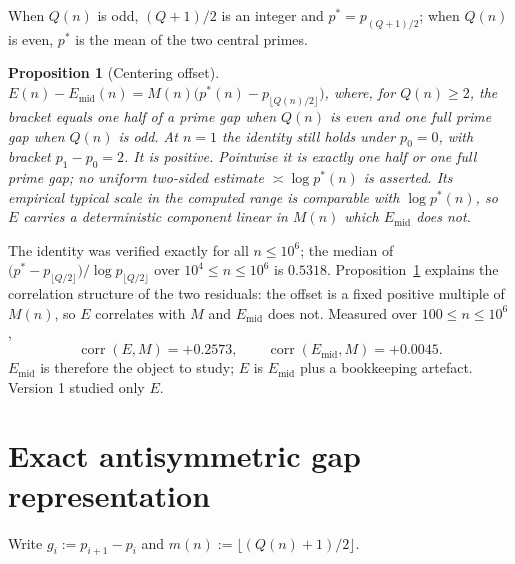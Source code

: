 \documentclass[11pt]{amsart}
\numberwithin{equation}{section}
\theoremstyle{plain}
\newtheorem{proposition}[theorem]{Proposition}
\theoremstyle{definition}
\theoremstyle{remark}
\newcommand{\Mert}{M}
\newcommand{\Sq}{Q}
\begin{document}
When $\Sq(n)$ is odd, $(\Sq+1)/2$ is an integer and $p^{*}=p_{(\Sq+1)/2}$; when
$\Sq(n)$ is even, $p^{*}$ is the mean of the two central primes.

\begin{proposition}[Centering offset]\label{prop:offset}
$E(n)-E_{\mathrm{mid}}(n)=\Mert(n)\bigl(p^{*}(n)-p_{\lfloor \Sq(n)/2\rfloor}\bigr)$,
where, for $\Sq(n)\ge2$, the bracket equals one half of a prime gap when
$\Sq(n)$ is even and one full prime gap when $\Sq(n)$ is odd. At $n=1$ the
identity still holds under $p_0=0$, with bracket $p_1-p_0=2$. It is positive. Pointwise it is exactly one half or one full prime gap; no
uniform two-sided estimate $\asymp\log p^{*}(n)$ is asserted. Its empirical
typical scale in the computed range is comparable with $\log p^{*}(n)$, so $E$
carries a deterministic component linear in $\Mert(n)$ which
$E_{\mathrm{mid}}$ does not.
\end{proposition}

The identity was verified exactly for all $n\le10^{6}$; the median of
$\bigl(p^{*}-p_{\lfloor \Sq/2\rfloor}\bigr)/\log p_{\lfloor \Sq/2\rfloor}$ over
$10^{4}\le n\le10^{6}$ is $0.5318$. Proposition~\ref{prop:offset} explains the
correlation structure of the two residuals: the offset is a fixed positive
multiple of $\Mert(n)$, so $E$ correlates with $\Mert$ and $E_{\mathrm{mid}}$
does not. Measured over $100\le n\le10^{6}$,
\begin{equation}
\label{eq:residual-correlations}
\operatorname{corr}(E,\Mert)=+0.2573,
\qquad
\operatorname{corr}(E_{\mathrm{mid}},\Mert)=+0.0045 .
\end{equation}
$E_{\mathrm{mid}}$ is therefore the object to study; $E$ is $E_{\mathrm{mid}}$
plus a bookkeeping artefact. Version 1 studied only $E$.

\section{Exact antisymmetric gap representation}
\label{sec:gap-representation}

Write $g_i:=p_{i+1}-p_i$ and $m(n):=\lfloor(\Sq(n)+1)/2\rfloor$.
\end{document}
